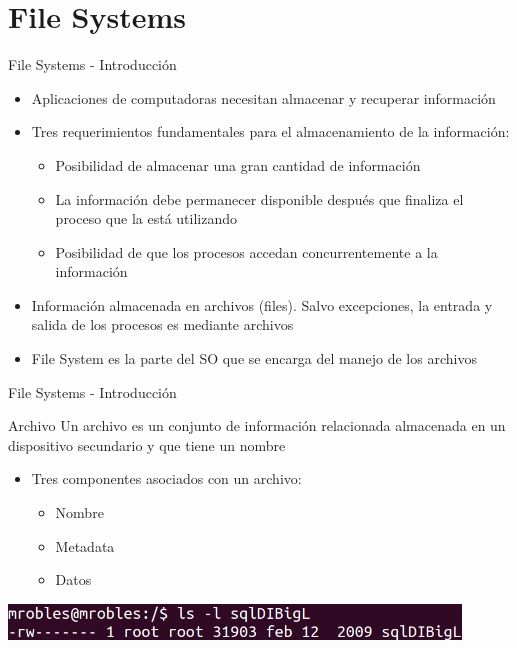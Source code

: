 
\section{File Systems}

\begin{frame}{File Systems - Introducción}
 \begin{itemize}
 \item Aplicaciones de computadoras necesitan almacenar y recuperar información
 \item Tres requerimientos fundamentales para el almacenamiento de la información:
  \begin{itemize}
   \item Posibilidad de almacenar una gran cantidad de información
   \item La información debe permanecer disponible después que finaliza el proceso que 
     la está utilizando
   \item Posibilidad de que los procesos accedan concurrentemente a la información
  \end{itemize}
  \item Información almacenada en archivos (files). Salvo excepciones, la entrada y salida de 
    los procesos es mediante archivos
  \item File System es la parte del SO que se encarga del manejo de los archivos
 \end{itemize}
\end{frame}

\begin{frame}{File Systems - Introducción}
 \begin{block}{Archivo}
   Un archivo es un conjunto de información relacionada almacenada en un dispositivo secundario y
    que tiene un nombre
 \end{block}
 \begin{itemize}  
  \item Tres componentes asociados con un archivo:
  \begin{itemize}
   \item Nombre
   \item Metadata 
   \item Datos 
  \end{itemize} 
 \end{itemize}
 \begin{center}
  \includegraphics[width=0.9\textwidth]{images/files1.png}
 \end{center} 
\end{frame}

